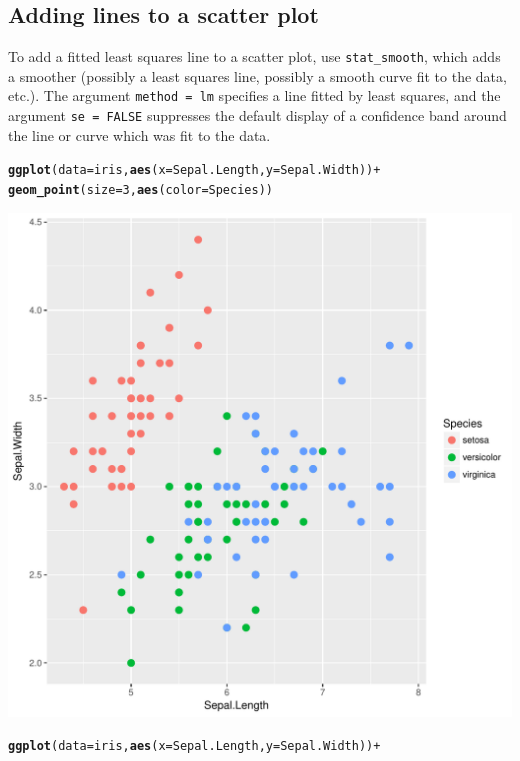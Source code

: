 \documentclass[12pt,oneside]{book}\usepackage[]{graphicx}\usepackage[]{color}
\makeatletter
\def\maxwidth{ %
  \ifdim\Gin@nat@width>\linewidth
    \linewidth
  \else
    \Gin@nat@width
  \fi
}
\newcommand{\hlnum}[1]{\textcolor[rgb]{0.686,0.059,0.569}{#1}}%
\newcommand{\hlopt}[1]{\textcolor[rgb]{0,0,0}{#1}}%
\newcommand{\hlstd}[1]{\textcolor[rgb]{0.345,0.345,0.345}{#1}}%
\newcommand{\hlkwc}[1]{\textcolor[rgb]{0.333,0.667,0.333}{#1}}%
\newcommand{\hlkwd}[1]{\textcolor[rgb]{0.737,0.353,0.396}{\textbf{#1}}}%
\newenvironment{kframe}{%
 \def\at@end@of@kframe{}%
 \ifinner\ifhmode%
  \def\at@end@of@kframe{\end{minipage}}%
  \begin{minipage}{\columnwidth}%
 \fi\fi%
 \def\FrameCommand##1{\hskip\@totalleftmargin \hskip-\fboxsep
 \colorbox{shadecolor}{##1}\hskip-\fboxsep
     \hskip-\linewidth \hskip-\@totalleftmargin \hskip\columnwidth}%
 \MakeFramed {\advance\hsize-\width
   \@totalleftmargin\z@ \linewidth\hsize
   \@setminipage}}%
 {\par\unskip\endMakeFramed%
 \at@end@of@kframe}
\newenvironment{knitrout}{}{} %
\makeatother
\begin{document}
\subsection{Adding lines to a scatter plot}
To add a fitted least squares line to a scatter plot, use \verb+stat_smooth+, which adds a smoother (possibly a least squares line, possibly a smooth curve fit to the data, etc.). The argument \verb+method = lm+ specifies a line fitted by least squares, and the argument \verb+se = FALSE+ suppresses the default display of a confidence band around the line or curve which was fit to the data.
\begin{knitrout}
\color{fgcolor}\begin{kframe}
\begin{alltt}
\hlkwd{ggplot}\hlstd{(}\hlkwc{data} \hlstd{= iris,} \hlkwd{aes}\hlstd{(}\hlkwc{x} \hlstd{= Sepal.Length,} \hlkwc{y} \hlstd{= Sepal.Width))} \hlopt{+}
    \hlkwd{geom_point}\hlstd{(}\hlkwc{size}\hlstd{=}\hlnum{3}\hlstd{,} \hlkwd{aes}\hlstd{(}\hlkwc{color}\hlstd{=Species))}
\end{alltt}
\end{kframe}
\includegraphics[width=\maxwidth]{figure/unnamed-chunk-65-1} 
\begin{kframe}\begin{alltt}
\hlkwd{ggplot}\hlstd{(}\hlkwc{data} \hlstd{= iris,} \hlkwd{aes}\hlstd{(}\hlkwc{x} \hlstd{= Sepal.Length,} \hlkwc{y} \hlstd{= Sepal.Width))} \hlopt{+}

\end{alltt}
\end{kframe}
\end{knitrout}
\end{document}
